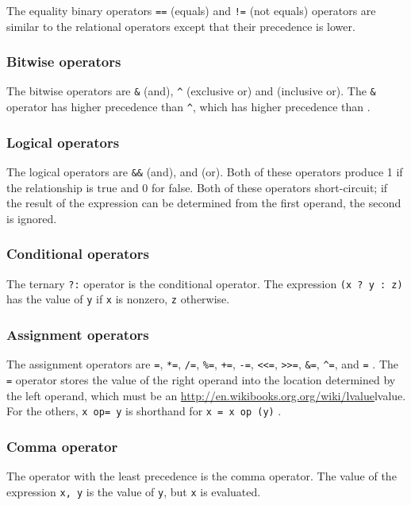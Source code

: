 The equality binary operators \texttt{==} (equals) and \texttt{!=} (not equals)
operators are similar to the relational operators except that their precedence
is lower.

\subsubsection{Bitwise operators}
The bitwise operators are \texttt{\&} (and), \texttt{\^{}} (exclusive or) and
\texttt{\textbar{}} (inclusive or). The \texttt{\&} operator has higher
precedence than \texttt{\^{}}, which has higher precedence than
\texttt{\textbar{}}.

\subsubsection{Logical operators}
The logical operators are \texttt{\&\&} (and), and
\texttt{\textbar{}\textbar{}} (or). Both of these operators produce 1 if the
relationship is true and 0 for false. Both of these operators short-circuit; if
the result of the expression can be determined from the first operand, the
second is ignored.

\subsubsection{Conditional operators}
The ternary \texttt{?:} operator is the conditional operator. The expression
\texttt{(x ? y : z)} has the value of \texttt{y} if \texttt{x} is nonzero,
\texttt{z} otherwise.

\subsubsection{Assignment operators}
The assignment operators are \texttt{=}, \texttt{*=}, \texttt{/=},
\texttt{\%=}, \texttt{+=}, \texttt{-=}, \texttt{\textless{}\textless{}=},
\texttt{\textgreater{}\textgreater{}=}, \texttt{\&=}, \texttt{\^{}=}, and
\texttt{\textbar{}=} . The \texttt{=} operator stores the value of the right
operand into the location determined by the left operand, which must be an
\url{http://en.wikibooks.org.org/wiki/lvalue}{lvalue}. For the others,
\texttt{x op= y} is shorthand for \texttt{x = x op (y)} .

\subsubsection{Comma operator}
The operator with the least precedence is the comma operator. The value of the
expression \texttt{x, y} is the value of \texttt{y}, but \texttt{x} is
evaluated.
